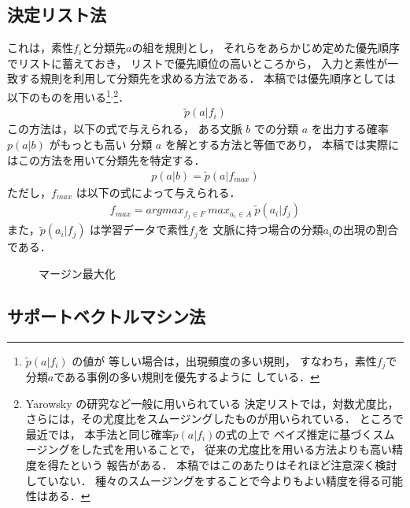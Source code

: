 \subsection{決定リスト法}

これは，素性$f_i$と分類先$a$の組を規則とし，
それらをあらかじめ定めた優先順序でリストに蓄えておき，
リストで優先順位の高いところから，
入力と素性が一致する規則を利用して分類先を求める方法である\cite{Yarowsky:ACL94}．
本稿では優先順序としては以下のものを用いる\footnote{$\tilde{p}(a|f_i)$ の値が
等しい場合は，出現頻度の多い規則，
すなわち，素性$f_j$で分類$a$である事例の多い規則を優先するように
している．}$^,$\footnote{Yarowsky の研究など一般に用いられている
決定リストでは，対数尤度比，
さらには，その尤度比をスムージングしたものが用いられている．
ところで最近では，
本手法と同じ確率$\tilde{p}(a|f_i)$の式の上で
ベイズ推定に基づくスムージングをした式を用いることで，
従来の尤度比を用いる方法よりも高い精度を得たという
報告\cite{tsuruoka_nlp2002}がある．
本稿ではこのあたりはそれほど注意深く検討していない．
種々のスムージングをすることで今よりもよい精度を得る可能性はある．}．
{
\begin{eqnarray}
  \label{eq:decision_list_order}
  \tilde{p}(a|f_i)
\end{eqnarray}
}
この方法は，以下の式で与えられる，
ある文脈 $b$ での分類 $a$ を出力する確率 $p(a|b)$ がもっとも高い
分類 $a$ を解とする方法と等価であり，
本稿では実際にはこの方法を用いて分類先を特定する．
{
\begin{eqnarray}
  \label{eq:decision_list}
  p(a|b) = \tilde{p}(a|f_{max})
\end{eqnarray}
}
ただし，$f_{max}$ は以下の式によって与えられる．
{
\begin{eqnarray}
  \label{eq:decision_list2}
  f_{max} = argmax_{f_j\in F} \ max_{a_i\in A} \ \tilde{p}(a_i|f_j)
\end{eqnarray}
}
また，$\tilde{p}(a_i|f_j)$ は学習データで素性$f_j$を
文脈に持つ場合の分類$a_i$の出現の割合である．

\begin{figure}[t]
      \begin{center}
      \end{center}
    \caption{マージン最大化}
    \label{fig:margin}
\end{figure}

\subsection{サポートベクトルマシン法}

